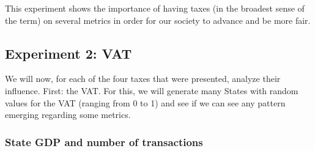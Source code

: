         This experiment shows the importance of having taxes (in the broadest sense of the term) on several metrics in order for our society to advance and be more fair.

    \subsection{Experiment 2: VAT}
    We will now, for each of the four taxes that were presented, analyze their influence. First: the VAT. For this, we will generate many States with random values for the VAT (ranging from 0 to 1) and see if we can see any pattern emerging regarding some metrics.

        \subsubsection{State GDP and number of transactions}

